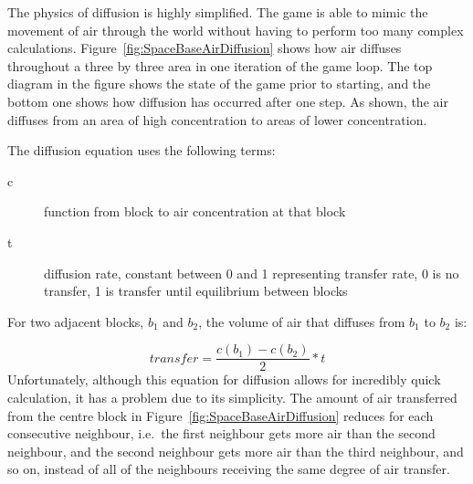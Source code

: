 The physics of diffusion is highly simplified. The game is able to mimic the movement of air through the world without having to perform too many complex calculations. Figure~\ref{fig:SpaceBaseAirDiffusion} shows how air diffuses throughout a three by three area in one iteration of the game loop. The top diagram in the figure shows the state of the game prior to starting, and the bottom one shows how diffusion has occurred after one step. As shown, the air diffuses from an area of high concentration to areas of lower concentration.

The diffusion equation uses the following terms:
\begin{description}
\item[c] function from block to air concentration at that block
\item[t] diffusion rate, constant between 0 and 1 representing transfer rate, 0 is no transfer, 1 is transfer until equilibrium between blocks
\end{description}
\noindent
For two adjacent blocks, $b_1$ and $b_2$, the volume of air that diffuses from $b_1$ to $b_2$ is:

$$ transfer = \frac{c(b_1) - c(b_2)}{2} * t $$
\noindent
Unfortunately, although this equation for diffusion allows for incredibly quick calculation, it has a problem due to its simplicity. The amount of air transferred from the centre block in Figure~\ref{fig:SpaceBaseAirDiffusion} reduces for each consecutive neighbour, i.e.\ the first neighbour gets more air than the second neighbour, and the second neighbour gets more air than the third neighbour, and so on, instead of all of the neighbours receiving the same degree of air transfer.


